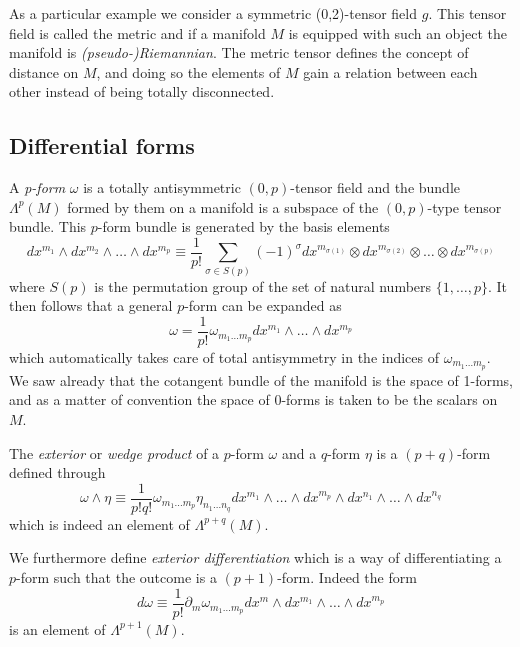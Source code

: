 \documentclass[12pt,twoside]{book}
\begin{document}
As a particular example we consider a symmetric (0,2)-tensor field $g$. This tensor field is called the metric and if a manifold $M$ is equipped with such an object the manifold is \emph{(pseudo-)Riemannian}. The metric tensor defines the concept of distance on $M$, and doing so the elements of $M$ gain a relation between each other instead of being totally disconnected.

\subsection{Differential forms}

A \emph{p-form} $\omega$ is a totally antisymmetric $(0,p)$-tensor field and the bundle $\Lambda^{p}(M)$ formed by them on a manifold is a subspace of the $(0,p)$-type tensor bundle. This $p$-form bundle is generated by the basis elements
\begin{equation}
dx^{m_{1}}\wedge dx^{m_{2}}\wedge\ldots\wedge dx^{m_{p}}\equiv\frac{1}{p!}\sum_{\sigma\in S(p)}(-1)^{\sigma}dx^{m_{\sigma(1)}}\otimes dx^{m_{\sigma(2)}}\otimes \ldots \otimes dx^{m_{\sigma(p)}}
\end{equation}
where $S(p)$ is the permutation group of the set of natural numbers $\{1,\ldots ,p\}$. It then follows that a general $p$-form can be expanded as
\begin{equation}
\omega = \frac{1}{p!}\omega_{m_{1}\ldots m_{p}}dx^{m_{1}}\wedge \ldots\wedge dx^{m_{p}}
\end{equation}
which automatically takes care of total antisymmetry in the indices of $\omega_{m_{1}\ldots m_{p}}$. We saw already that the cotangent bundle of the manifold is the space of 1-forms, and as a matter of convention the space of 0-forms is taken to be the scalars on $M$.

The \emph{exterior} or \emph{wedge product} of a $p$-form $\omega$ and a $q$-form $\eta$ is a $(p+q)$-form defined through
\begin{equation}
\omega\wedge\eta \equiv\frac{1}{p!q!}\omega_{m_{1}\ldots m_{p}}\eta_{n_{1}\ldots n_{q}} dx^{m_{1}}\wedge \ldots\wedge dx^{m_{p}}\wedge dx^{n_{1}}\wedge \ldots\wedge dx^{n_{q}}
\end{equation} which is indeed an element of $\Lambda^{p+q}(M)$.

We furthermore define \emph{exterior differentiation} which is a way of differentiating a $p$-form such that the outcome is a $(p+1)$-form. Indeed the form
\begin{equation}
d\omega \equiv \frac{1}{p!}\partial_{m}\omega_{m_{1}\ldots m_{p}}dx^{m}\wedge dx^{m_{1}}\wedge \ldots \wedge dx^{m_{p}}
\end{equation}
is an element of $\Lambda^{p+1}(M)$. 
\end{document}
